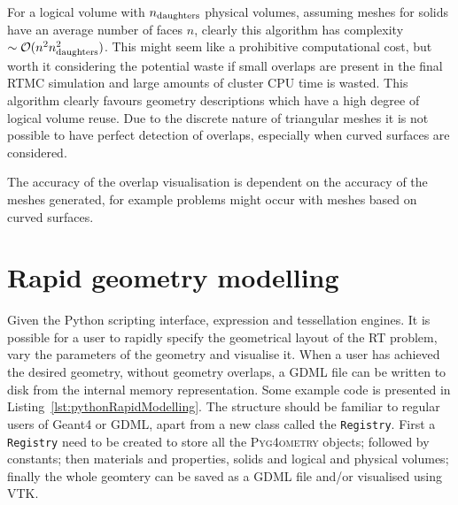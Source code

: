 \documentclass[final,5p,times,twocolumn]{elsarticle}
\newcommand{\pyinline}[1]{\lstinline[postbreak={}]{#1}}
\newcommand{\PYGEOMETRY}{\textsc{Pyg4ometry}}
\begin{document}
For a logical volume with $n_{\rm daughters}$ physical volumes, assuming meshes for solids have an average number of faces $n$, clearly this algorithm 
has complexity $\sim \mathcal{O}(n^2 n_{\rm daughters}^2)$. This might seem like a prohibitive computational cost, but worth it considering the potential 
waste if small overlaps are present in the final RTMC simulation and large amounts of cluster CPU time is wasted. This algorithm clearly favours geometry descriptions which have a high degree of logical volume reuse. Due to the discrete nature of triangular meshes it is not possible to have perfect detection 
of overlaps, especially when curved surfaces are considered. 

The accuracy of the overlap visualisation is dependent on the accuracy of the meshes generated, for example problems might occur 
with meshes based on curved surfaces.  



\section{Rapid geometry modelling}
Given the Python scripting interface, expression  and tessellation engines. It is possible for a user to rapidly specify the geometrical layout of the RT problem, vary 
the parameters of the geometry and visualise it.  When a user has achieved the desired geometry, without geometry overlaps, a GDML file can be written to disk from the internal memory representation. Some example code is presented in Listing~\ref{lst:pythonRapidModelling}. The structure should be familiar to regular 
users of Geant4 or GDML, apart from a new class called the \pyinline{Registry}. First a \verb|Registry| need to be created to store all the \PYGEOMETRY{} objects; followed by constants;  then materials and properties, solids and logical and physical volumes; finally the whole geomtery can be saved as a GDML file and/or visualised using VTK.
\end{document}
